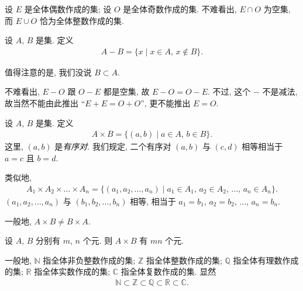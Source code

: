 \begin{example}[label={example:EvenAndOdd}]
    设 $E$ 是全体偶数作成的集; 设 $O$ 是全体奇数作成的集. 不难看出, $E \cap O$ 为空集, 而 $E \cup O$ 恰为全体整数作成的集.
\end{example}

\begin{definition}
    设 $A$, $B$ 是集. 定义
    \begin{align*}
        A - B = \{ x \mid \text{$x \in A$, $x \notin B$} \}.
    \end{align*}
\end{definition}

\begin{remark}
    值得注意的是, 我们没说 $B \subset A$.
\end{remark}

\begin{example}[continues={example:EvenAndOdd}]
    不难看出, $E - O$ 跟 $O - E$ 都是空集, 故 $E - O = O - E$. 不过, 这个 $-$ 不是减法, 故当然不能由此推出 ``$E + E = O + O$'', 更不能推出 $E = O$.
\end{example}

\begin{definition}
    设 $A$, $B$ 是集. 定义
    \begin{align*}
        A \times B = \{ (a,b) \mid \text{$a \in A$, $b \in B$} \}.
    \end{align*}
    这里, $(a, b)$ 是\emph{有序对}. 我们规定, 二个有序对 $(a, b)$ 与 $(c, d)$ 相等相当于 $a = c$ 且 $b = d$.

    类似地,
    \begin{align*}
        A_1 \times A_2 \times \dots \times A_n = \{ (a_1, a_2, \dots, a_n) \mid \text{$a_1 \in A_1$, $a_2 \in A_2$, $\dots$, $a_n \in A_n$} \}.
    \end{align*}
    $(a_1, a_2, \dots, a_n)$ 与 $(b_1, b_2, \dots, b_n)$ 相等, 相当于 $a_1 = b_1$, $a_2 = b_2$, $\dots$, $a_n = b_n$.
\end{definition}

\begin{remark}
    一般地, $A \times B \neq B \times A$.
\end{remark}

\begin{remark}
    设 $A$, $B$ 分别有 $m$, $n$ 个元. 则 $A \times B$ 有 $mn$ 个元.
\end{remark}

\begin{definition}
    一般地, $\mathbb{N}$ 指全体非负整数作成的集; $\mathbb{Z}$ 指全体整数作成的集; $\mathbb{Q}$ 指全体有理数作成的集; $\mathbb{R}$ 指全体实数作成的集; $\mathbb{C}$ 指全体复数作成的集. 显然
    \begin{align*}
        \mathbb{N} \subset \mathbb{Z} \subset \mathbb{Q} \subset \mathbb{R} \subset \mathbb{C}.
    \end{align*}
\end{definition}

